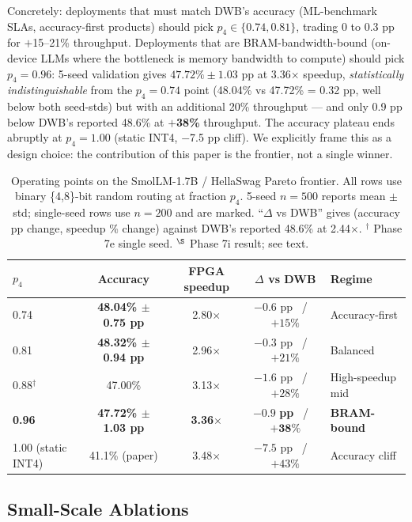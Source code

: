 \documentclass{article}
\begin{document}
Concretely: deployments that must match DWB's accuracy (ML-benchmark SLAs, accuracy-first products) should pick $p_4 \in \{0.74, 0.81\}$, trading 0 to 0.3 pp for $+$15--21\% throughput. Deployments that are BRAM-bandwidth-bound (on-device LLMs where the bottleneck is memory bandwidth to compute) should pick $p_4 = 0.96$: 5-seed validation gives $47.72\% \pm 1.03$ pp at 3.36$\times$ speedup, \emph{statistically indistinguishable} from the $p_4=0.74$ point (48.04\% vs 47.72\% = 0.32 pp, well below both seed-stds) but with an additional 20\% throughput --- and only 0.9 pp below DWB's reported 48.6\% at \textbf{$+$38\%} throughput. The accuracy plateau ends abruptly at $p_4 = 1.00$ (static INT4, $-$7.5 pp cliff). We explicitly frame this as a design choice: the contribution of this paper is the frontier, not a single winner.

\begin{table}[h]
\centering
\caption{Operating points on the SmolLM-1.7B / HellaSwag Pareto frontier. All rows use binary \{4,8\}-bit random routing at fraction $p_4$. 5-seed $n{=}500$ reports mean $\pm$ std; single-seed rows use $n{=}200$ and are marked. ``$\Delta$ vs DWB'' gives (accuracy pp change, speedup \% change) against DWB's reported 48.6\% at 2.44$\times$. $^\dagger$ Phase 7e single seed. $^{\S}$ Phase 7i result; see text.}
\begin{tabular}{lcccl}
\toprule
$p_4$ & Accuracy & FPGA speedup & $\Delta$ vs DWB & Regime \\
\midrule
0.74  & \textbf{48.04\% $\pm$ 0.75 pp} & 2.80$\times$ & $-0.6$ pp \ / \ $+15\%$    & Accuracy-first \\
0.81  & \textbf{48.32\% $\pm$ 0.94 pp} & 2.96$\times$ & $-0.3$ pp \ / \ $+21\%$    & Balanced \\
0.88$^\dagger$ & 47.00\%                 & 3.13$\times$ & $-1.6$ pp \ / \ $+28\%$    & High-speedup mid \\
\textbf{0.96} & \textbf{47.72\% $\pm$ 1.03 pp} & \textbf{3.36}$\times$ & $\mathbf{-0.9}$ \textbf{pp} \ / \ $\mathbf{+38\%}$ & \textbf{BRAM-bound} \\
\midrule
1.00 (static INT4) & 41.1\% (paper) & 3.48$\times$ & $-7.5$ pp \ / \ $+43\%$ & Accuracy cliff \\
\bottomrule
\end{tabular}
\label{tab:operating_points}
\end{table}

\subsection{Small-Scale Ablations}
\label{sec:ablations}
\end{document}
